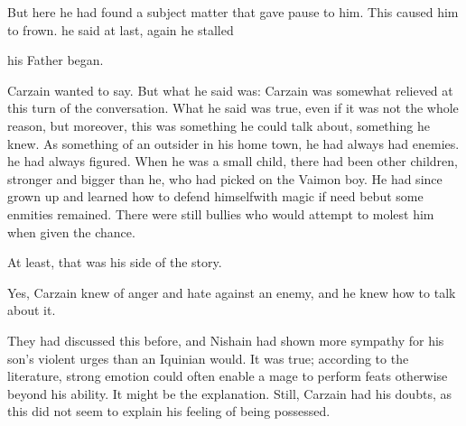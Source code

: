 But here he had found a subject matter that gave pause to him. 
This caused him to frown. 
 he said at last, 
\dash{}again he stalled\dash{}%

 his Father began.  

 Carzain wanted to say. But what he said was: 
Carzain was somewhat relieved at this turn of the conversation. What he said was true, even if it was not the whole reason, but moreover, this was something he could talk about, something he knew. 
As something of an outsider in his home town, he had always had enemies. 
 he had always figured. 
When he was a small child, there had been other children, stronger and bigger than he, who had picked on the  Vaimon boy. 
He had since grown up and learned how to defend himself\dash with magic if need be\dash but some enmities remained. 
There were still bullies who would attempt to molest him when given the chance. 

At least, that was his side of the story. 

Yes, Carzain knew of anger and hate against an enemy, and he knew how to talk about it. 

They had discussed this before, and Nishain had shown more sympathy for his son's violent urges than an Iquinian would. 
It was true; according to the literature, strong emotion could often enable a mage to perform feats otherwise beyond his ability. It might be the explanation. Still, Carzain had his doubts, as this did not seem to explain his feeling of being possessed. 


